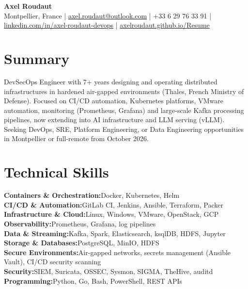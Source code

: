 \documentclass[10pt,a4paper]{article}
\newcommand{\skillrow}[2]{\textbf{#1:}\hspace{0.35em}#2\\}
\begin{document}
{\Huge\bfseries\color{accent}Axel Roudaut}\\[3pt]
{\small\color{muted}%
Montpellier, France \enspace|\enspace
\href{mailto:axel.roudaut@outlook.com}{axel.roudaut@outlook.com} \enspace|\enspace
+33 6 29 76 33 91 \enspace|\enspace
\href{https://www.linkedin.com/in/axel-roudaut-devops/}{linkedin.com/in/axel-roudaut-devops} \enspace|\enspace
\href{https://axelroudaut.github.io/Resume/}{axelroudaut.github.io/Resume}}

\section{Summary}
DevSecOps Engineer with 7+ years designing and operating distributed infrastructures in hardened
air-gapped environments (Thales, French Ministry of Defense). Focused on CI/CD automation, Kubernetes
platforms, VMware automation, monitoring (Prometheus, Grafana) and large-scale Kafka processing pipelines, now extending into AI
infrastructure and LLM serving (vLLM). Seeking DevOps, SRE, Platform Engineering, or Data Engineering
opportunities in Montpellier or full-remote from October 2026.

\section{Technical Skills}
\skillrow{Containers \& Orchestration}{Docker, Kubernetes, Helm}
\skillrow{CI/CD \& Automation}{GitLab CI, Jenkins, Ansible, Terraform, Packer}
\skillrow{Infrastructure \& Cloud}{Linux, Windows, VMware, OpenStack, GCP}
\skillrow{Observability}{Prometheus, Grafana, log pipelines}
\skillrow{Data \& Streaming}{Kafka, Spark, Elasticsearch, ksqlDB, HDFS, Jupyter}
\skillrow{Storage \& Databases}{PostgreSQL, MinIO, HDFS}
\skillrow{Secure Environments}{Air-gapped networks, secrets management (Ansible Vault), CI/CD security scanning}
\skillrow{Security}{SIEM, Suricata, OSSEC, Sysmon, SIGMA, TheHive, auditd}
\skillrow{Programming}{Python, Go, Bash, PowerShell, REST APIs}
\end{document}

